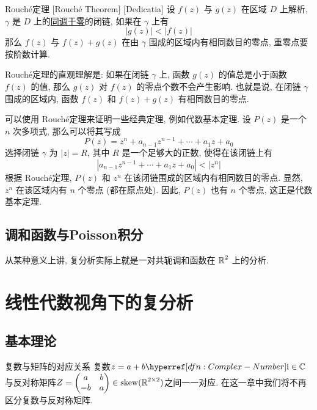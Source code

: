         \begin{thm}
            [Rouche]
            {Rouch\'e定理}
            [Rouch\'e Theorem]
            [Dedicatia]
            设 \(f(z)\) 与 \(g(z)\) 在区域 \(D\) 上解析,  \(\gamma\) 是 \(D\) 上的\hyperref[dfn:Null-Homologous]{同调于零}的闭链, 如果在 \(\gamma\) 上有
            \[|g(z)|<|f(z)|\]
            那么 \(f(z)\) 与 \(f(z)+g(z)\) 在由 \(\gamma\) 围成的区域内有相同数目的零点, 重零点要按阶数计算.
        \end{thm}

        \begin{rmk}
            [Dedicatia]
            Rouch\'e定理的直观理解是: 如果在闭链 \(\gamma\) 上, 函数 \(g(z)\) 的值总是小于函数 \(f(z)\) 的值, 那么 \(g(z)\) 对 \(f(z)\) 的零点个数不会产生影响. 也就是说, 在闭链 \(\gamma\) 围成的区域内, 函数 \(f(z)\) 和 \(f(z)+g(z)\) 有相同数目的零点.
        \end{rmk}

        \begin{rmk}
            [Dedicatia]
            可以使用 Rouch\'e定理来证明一些经典定理, 例如代数基本定理. 设 \(P(z)\) 是一个 \(n\) 次多项式, 那么可以将其写成
            \[P(z)=z^n+a_{n-1}z^{n-1}+\cdots+a_1 z+a_0\]
            选择闭链 \(\gamma\) 为 \(|z|=R\), 其中 \(R\) 是一个足够大的正数, 使得在该闭链上有
            \[|a_{n-1}z^{n-1}+\cdots+a_1 z+a_0|<|z^n|\]
            根据 Rouch\'e定理, \(P(z)\) 和 \(z^n\) 在该闭链围成的区域内有相同数目的零点. 显然, \(z^n\) 在该区域内有 \(n\) 个零点 (都在原点处). 因此, \(P(z)\) 也有 \(n\) 个零点, 这正是代数基本定理.
        \end{rmk}

    \subsection{调和函数与Poisson积分}

        从某种意义上讲, 复分析实际上就是一对共轭调和函数在 \(\operatorname{\mathbb{R}}^2\) 上的分析. 

        \continued

\section{线性代数视角下的复分析}
    
    \subsection{基本理论}

        \begin{thm}
            {复数与矩阵的对应关系}
            复数\(z=a+b\ii\in\C\)与反对称矩阵\(Z=\begin{pmatrix}
                a&b\\-b&a
            \end{pmatrix}\in\operatorname{skew}(\operatorname{\mathbb{R}}^{2\times 2})\)之间一一对应. 在这一章中我们将不再区分复数与反对称矩阵. 
        \end{thm}

